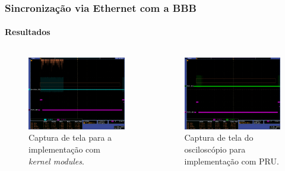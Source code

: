 \begin{frame}
\frametitle{Sincronização via Ethernet com a BBB }
\framesubtitle{Resultados}


\begin{columns}

\begin{column}{.5\textwidth}

\begin{figure}[h!]
\centering
\includegraphics[width=\textwidth]{image/tek_com_threads}
\caption {\centering Captura de tela para a implementação com
\textit{kernel modules}.}
\label{fig:osciloscopio_thread}
\end{figure}
\end{column}%
\begin{column}{.5\textwidth}

\begin{figure}[h!]
\centering
\includegraphics[width=\textwidth]{image/tek_pru}
\caption {\centering Captura de tela do osciloscópio para implementação com
PRU.}
\label{fig:pru_osciloscopio_thread}
\end{figure}
\end{column}

\end{columns}
\end{frame}